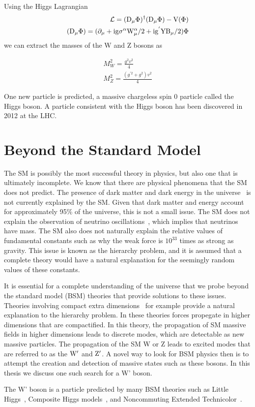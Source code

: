 Using the Higgs Lagrangian
\begin{eqnarray}
\cal{L} = \mathrm{(D_{\mu} \Phi )^{\dagger}(D_{\mu} \Phi ) -V( \Phi )}\\
\mathrm{(D_{\mu}\Phi) = (\partial_{\mu}+i g \sigma^{\alpha} W_{\mu}^{\alpha}/2 +i g^{'} Y B_{\mu}/2)\Phi}
\end{eqnarray}  
we can extract the masses of the W and Z bosons as

\begin{eqnarray}
M_{W}^2 = \frac{g^{2}v^{2}}{4}\\
M_{Z}^2 = \frac{(g^{'2}+g^{2})v^{2}}{4}
\end{eqnarray}  

One new particle is predicted, a massive chargeless spin 0 particle called the Higgs boson.  
A particle consistent with the Higgs boson has been discovered in 2012 at the LHC.  

  
\section{Beyond the Standard Model}
\label{sec:BSMtheory}
The SM is possibly the most successful theory in physics, but also one that is ultimately incomplete.  
We know that there are physical phenomena that the SM does not predict.  
The presence of dark matter and dark energy in the universe~\cite{Bennett:2003ba} is not currently explained by the SM.  
Given that dark matter and energy account for approximately 95\% of the universe, this is not a small issue.  
The SM does not explain the observation of neutrino oscillations~\cite{An:2012eh}, which implies that neutrinos have mass.  
The SM also does not naturally explain the relative values of fundamental constants such as why the weak force is $10^{33}$ times as strong as gravity.  
This issue is known as the hierarchy problem, and it is assumed that a complete theory would have a natural explanation for the seemingly random values of these constants.  

It is essential for a complete understanding of the universe that we probe beyond the standard model (BSM) theories that provide solutions to these issues.  
Theories involving compact extra dimensions~\cite{PhysRevD.64.035002} for example provide a natural explanation to the hierarchy problem.  
In these theories forces propegate in higher dimensions that are compactified.   
In this theory, the propagation of SM massive fields in higher dimensions leads to discrete modes, which are detectable as new massive particles.  
The propagation of the SM W or Z leads to excited modes that are referred to as the $\mathrm{W}^{\prime}$ and $\mathrm{Z}^{\prime}$.
A novel way to look for BSM physics then is to attempt the creation and detection of massive states such as these bosons. 
In this thesis we discuss one such search for a W' boson.  

The W' boson is a particle predicted by many BSM theories such as Little Higgs~\cite{doi:10.1146/annurev.nucl.55.090704.151502}, 
Composite Higgs models~\cite{Vecchi:2013bja}, and Noncommuting Extended Technicolor~\cite{Chivukula:1995gu}.  



